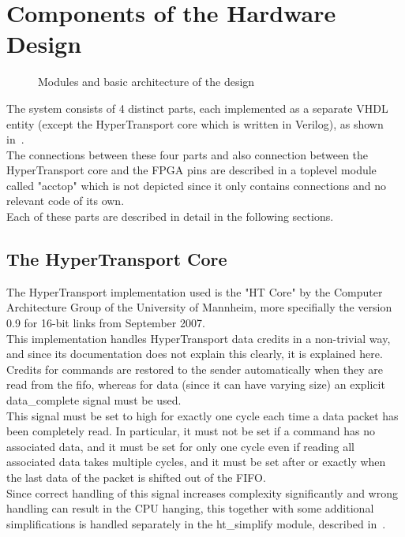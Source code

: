 \chapter{Components of the Hardware Design}

\begin{figure}[ht]
\begin{center}

\end{center}
\caption{Modules and basic architecture of the design}
\label{fig:modules}
\end{figure}

The system consists of 4 distinct parts, each implemented as a
separate VHDL entity (except the HyperTransport core which is written in
Verilog), as shown in~.\\
The connections between these four parts and also connection between the
HyperTransport core and the FPGA pins are described in a toplevel module
called "acctop" which is not depicted since it only contains connections
and no relevant code of its own.\\
Each of these parts are described in detail in the following sections.

\section{The HyperTransport Core}

The HyperTransport implementation used is the "HT Core" by the Computer
Architecture Group of the University of Mannheim, more specifially the
version 0.9 for 16-bit links from September 2007.\\
This implementation handles HyperTransport data credits in a non-trivial
way, and since its documentation does not explain this clearly, it is
explained here.\\
Credits for commands are restored to the sender automatically when they are
read from the fifo, whereas for data (since it can have varying size) an
explicit data\_complete signal must be used.\\
This signal must be set to high for exactly one cycle each time a data packet
has been completely read. In particular, it must not be set if a command
has no associated data, and it must be set for only one cycle even if reading
all associated data takes multiple cycles, and it must be set after or
exactly when the last data of the packet is shifted out of the FIFO.\\
Since correct handling of this signal increases complexity significantly
and wrong handling can result in the CPU hanging, this together with some
additional simplifications is handled separately in the ht\_simplify module,
described in~.

